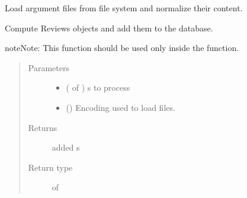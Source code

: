 \documentclass[letterpaper,10pt,english]{sphinxmanual}
\begin{document}
\begin{fulllineitems}
\label{\detokenize{process:loacore.process.review_process.add_reviews_from_files}}
Load argument files from file system and normalize their content.

Compute Reviews objects and add them to the database.

\begin{sphinxadmonition}{note}{Note:}
This function should be used only inside the  function.
\end{sphinxadmonition}
\begin{quote}\begin{description}
\item[{Parameters}] \leavevmode\begin{itemize}
\item {} 
 ( of ) \textendash{}  s to process

\item {} 
 () \textendash{} Encoding used to load files.

\end{itemize}

\item[{Returns}] \leavevmode
added  s

\item[{Return type}] \leavevmode
{} of 

\end{description}\end{quote}

\end{fulllineitems}

\end{document}
